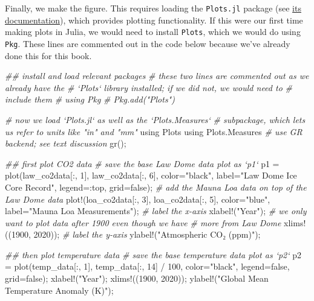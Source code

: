 \documentclass[
  11pt,
]{book}
\newenvironment{Shaded}{\begin{snugshade}}{\end{snugshade}}
\newcommand{\CommentTok}[1]{\textcolor[rgb]{0.37,0.37,0.37}{\textit{#1}}}
\newcommand{\FloatTok}[1]{\textcolor[rgb]{0.06,0.06,0.06}{#1}}
\newcommand{\NormalTok}[1]{#1}
\newcommand{\StringTok}[1]{\textcolor[rgb]{0.5,0.5,0.5}{#1}}
\begin{document}
Finally, we make the figure. This requires loading the \texttt{Plots.jl} package (see \href{http://docs.juliaplots.org/latest/}{its documentation}), which provides plotting functionality. If this were our first time making plots in Julia, we would need to install \texttt{Plots}, which we would do using \texttt{Pkg}. These lines are commented out in the code below because we've already done this for this book.

\begin{Shaded}
\begin{Highlighting}[]
\CommentTok{## install and load relevant packages}
\CommentTok{# these two lines are commented out as we already have the }
\CommentTok{# `Plots` library installed; if we did not, we would need to }
\CommentTok{# include them}
\CommentTok{# using Pkg}
\CommentTok{# Pkg.add("Plots")}

\CommentTok{# now we load `Plots.jl` as well as the `Plots.Measures` }
\CommentTok{# subpackage, which lets us refer to units like "in" and "mm"}
\NormalTok{using Plots}
\NormalTok{using Plots.Measures}
\CommentTok{# use GR backend; see text discussion}
\NormalTok{gr(); }

\CommentTok{## first plot CO2 data}
\CommentTok{# save the base Law Dome data plot as `p1`}
\NormalTok{p1 = plot(law_co2data[:, }\FloatTok{1}\NormalTok{], law_co2data[:, }\FloatTok{6}\NormalTok{], color=}\StringTok{"black"}\NormalTok{, }
\NormalTok{    label=}\StringTok{"Law Dome Ice Core Record"}\NormalTok{, legend=:top, grid=false);}
\CommentTok{# add the Mauna Loa data on top of the Law Dome data}
\NormalTok{plot!(loa_co2data[:, }\FloatTok{3}\NormalTok{], loa_co2data[:, }\FloatTok{5}\NormalTok{], color=}\StringTok{"blue"}\NormalTok{, }
\NormalTok{    label=}\StringTok{"Mauna Loa Measurements"}\NormalTok{); }
\CommentTok{# label the x-axis}
\NormalTok{xlabel!(}\StringTok{"Year"}\NormalTok{); }
\CommentTok{# we only want to plot data after 1900 even though we have }
\CommentTok{# more from Law Dome}
\NormalTok{xlims!((}\FloatTok{1900}\NormalTok{, }\FloatTok{2020}\NormalTok{)); }
\CommentTok{# label the y-axis}
\NormalTok{ylabel!(}\StringTok{"Atmospheric CO₂ (ppm)"}\NormalTok{); }

\CommentTok{## then plot temperature data}
\CommentTok{# save the base temperature data plot as `p2`}
\NormalTok{p2 = plot(temp_data[:, }\FloatTok{1}\NormalTok{], temp_data[:, }\FloatTok{14}\NormalTok{] / }\FloatTok{100}\NormalTok{, }
\NormalTok{    color=}\StringTok{"black"}\NormalTok{, legend=false, grid=false); }
\NormalTok{xlabel!(}\StringTok{"Year"}\NormalTok{);}
\NormalTok{xlims!((}\FloatTok{1900}\NormalTok{, }\FloatTok{2020}\NormalTok{));}
\NormalTok{ylabel!(}\StringTok{"Global Mean Temperature Anomaly (K)"}\NormalTok{);}


\end{Highlighting}
\end{Shaded}
\end{document}
